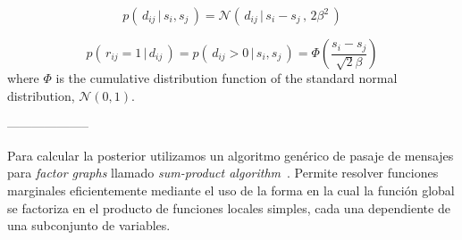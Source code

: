 \documentclass[article]{jss}
\newif\ifen
\newif\ifes
\newcommand{\en}[1]{\ifen#1\fi}
\newcommand{\es}[1]{\ifes#1\fi}
\newcommand{\N}{\mathcal{N}}
\begin{document}
%
\en{It can be shown [SE DEMOSTRARA EN LA SECCIÓN SIGUIENTE], based on Gaussians properties, that the difference of performance $d_{ij}$ is also normally distributed, centered at the skill difference point with double variance.}
\es{}
%
\begin{equation}
 p( \, d_{ij} \,|\,  s_i, s_j\, ) = \N(\, d_{ij} \,|\, s_i - s_j \, , \, 2\beta^2 \,)
\end{equation}
%
\en{This reduces the problem of computing the probability of the game outcome to a single-dimension problem related to the performance difference.}
\es{This reduces the problem of computing the probability of the game outcome to a single-dimension problem related to the performance difference.}
%
\en{Let the result of a game $r_{ij} = \mathbb{I}(d_{ij}>0)$.
The probability of winning, $r_{ij} = 1$, can be computed as:}
\es{}
%
\begin{equation}
p(\,r_{ij}=1\,|\,d_{ij}\,) = p(\,d_{ij} > 0 \,|\, s_i, s_j\,) = \Phi \left(\frac{s_i - s_j}{\sqrt{2}\beta} \right)
\end{equation}
%
where $\Phi$ is the cumulative distribution function of the standard normal distribution, $\N(0, 1)$.










--------------------


Para calcular la posterior utilizamos un algoritmo gen\'erico de pasaje de mensajes para \emph{factor graphs} llamado \emph{sum-product algorithm}~\cite{kschischang2001-factorGraphsAndTheSumProductAlgorithm}.
Permite resolver funciones marginales eficientemente mediante el uso de la forma en la cual la funci\'on global se factoriza en el producto de funciones locales simples, cada una dependiente de una subconjunto de variables.
\end{document}
